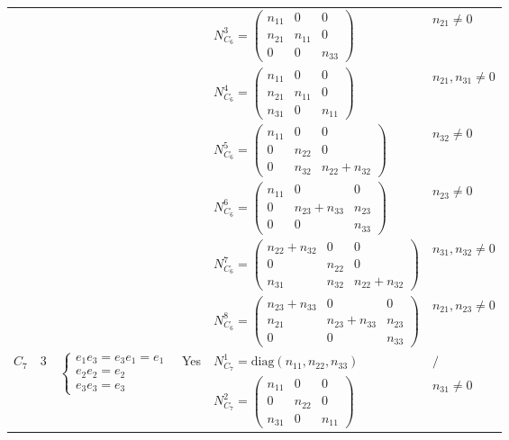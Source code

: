 \documentclass[12pt, reqno]{amsart}
\theoremstyle{plain}
\begin{document}
\begin{table}[H]
\begin{tabular}{|c|c|l|l|l|l|}
    & & & & $N_{C_6}^3 = \begin{pmatrix} n_{11} & 0 & 0 \\ n_{21} & n_{11} & 0 \\ 0 & 0 & n_{33} \end{pmatrix}$ & $n_{21}\neq0$ \\
    & & & & $N_{C_6}^4 = \begin{pmatrix} n_{11} & 0 & 0 \\ n_{21} & n_{11} & 0 \\ n_{31} & 0 & n_{11} \end{pmatrix}$ & $n_{21},n_{31}\neq0$ \\
    & & & & $N_{C_6}^5 = \begin{pmatrix} n_{11} & 0 & 0 \\ 0 & n_{22} & 0 \\ 0 & n_{32} & n_{22}+n_{32} \end{pmatrix}$ & $n_{32}\neq0$ \\
    & & & & $N_{C_6}^6 = \begin{pmatrix} n_{11} & 0 & 0 \\ 0 & n_{23}+n_{33} & n_{23} \\ 0 & 0 & n_{33} \end{pmatrix}$ & $n_{23}\neq0$ \\
    & & & & $N_{C_6}^7 = \begin{pmatrix} n_{22}+n_{32} & 0 & 0 \\ 0 & n_{22} & 0 \\ n_{31} & n_{32} & n_{22}+n_{32} \end{pmatrix}$ & $n_{31},n_{32}\neq0$ \\
    & & & & $N_{C_6}^8 = \begin{pmatrix} n_{23}+n_{33} & 0 & 0 \\ n_{21} & n_{23}+n_{33} & n_{23} \\ 0 & 0 & n_{33} \end{pmatrix}$ & $n_{21},n_{23}\neq0$ \\
    \hline
    \multirow{8}{*}{$C_7$} & \multirow{8}{*}{3} & \multirow{8}{*}{$\begin{cases} e_1 e_3 = e_3 e_1 = e_1 \\ e_2 e_2 = e_2 \\ e_3 e_3 = e_3 \end{cases}$} & \multirow{8}{*}{Yes} & 
    $N_{C_7}^1 = \text{diag}(n_{11}, n_{22}, n_{33})$ & $/$ \\
    & & & & $N_{C_7}^2 = \begin{pmatrix} n_{11} & 0 & 0 \\ 0 & n_{22} & 0 \\ n_{31} & 0 & n_{11} \end{pmatrix}$ & $n_{31}\neq0$ \\

\end{tabular}
\end{table}
\end{document}
